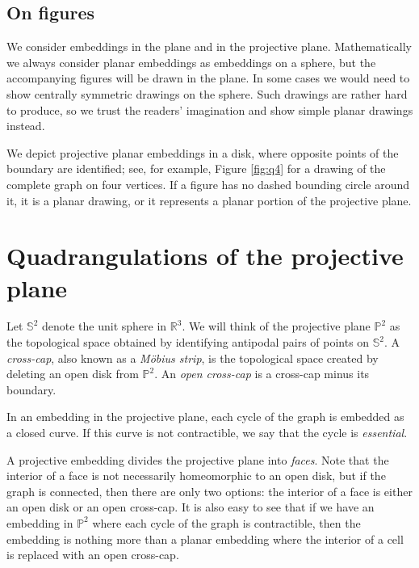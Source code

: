 \documentclass[10pt,a4paper]{article}
\newcommand{\R}[0]{\mathbb{R}}
\newcommand{\Pb}[0]{\mathbb{P}}
\newcommand{\Sb}[0]{\mathbb{S}}
\begin{document}
\subsection{On figures}
 We consider embeddings in the plane and in the projective plane. Mathematically we always consider planar embeddings as embeddings on a sphere, but the accompanying figures will be drawn in the plane. In some cases we would need to show centrally symmetric drawings on the sphere. Such drawings are rather hard to produce, so we trust the readers' imagination and show simple planar drawings instead.
 
 We depict projective planar embeddings in a disk, where opposite points of the boundary are identified; see, for example, Figure \ref{fig:q4} for a drawing of the complete graph on four vertices. If a figure has no dashed bounding circle around it, it is a planar drawing, or it represents a planar portion of the projective plane. 

 







\section{Quadrangulations of the projective plane} \label{sec:quad}
 Let $\Sb^2$ denote the unit sphere in $\R^3$. We will think of the projective plane $\Pb^2$ as the topological space obtained by identifying antipodal pairs of points on $\Sb^2$. A \emph{cross-cap}, also known as a \emph{Möbius strip}, is the topological space created by deleting an open disk from $\Pb^2$. An \emph{open cross-cap} is a cross-cap minus its boundary. 
 
 In an embedding in the projective plane, each cycle of the graph is embedded as a closed curve. If this curve is not contractible, we say that the cycle is \emph{essential}.  

 A projective embedding divides the projective plane into \emph{faces}. Note that the interior of a face is not necessarily homeomorphic to an open disk, but if the graph is connected, then there are only two options: the interior of a face is either an open disk or an open cross-cap. It is also easy to see that if we have an embedding in $\Pb^2$ where each cycle of the graph is contractible, then the embedding is nothing more than a planar embedding where the interior of a cell is replaced with an open cross-cap. 
\end{document}
